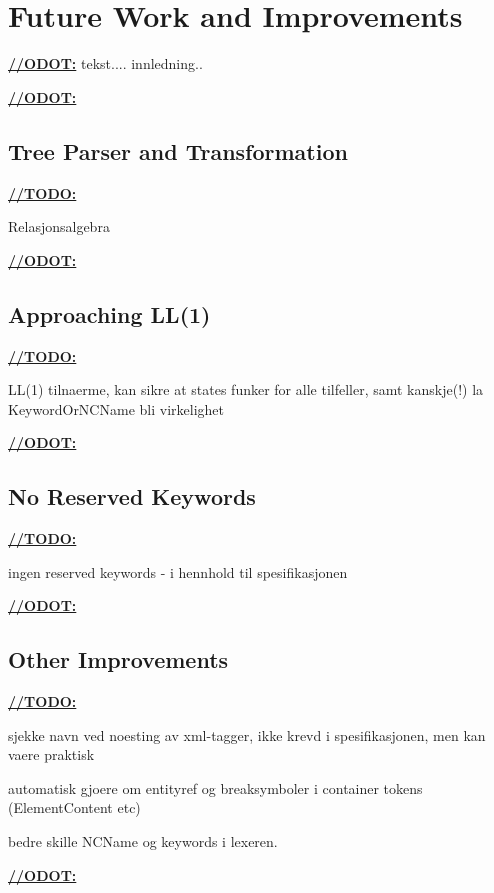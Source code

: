 \chapter{Future Work and Improvements}
\label{sect:summary:future_work}
\underline{\textbf{\LARGE //ODOT:}} tekst.... innledning..




\underline{\textbf{\LARGE //ODOT:}}

\section{Tree Parser and Transformation}
\underline{\textbf{\LARGE //TODO:}}

Relasjonsalgebra

\underline{\textbf{\LARGE //ODOT:}}

\section{Approaching LL(1)}

\underline{\textbf{\LARGE //TODO:}}

LL(1) tilnaerme, kan sikre at states funker for alle tilfeller, samt kanskje(!) la KeywordOrNCName bli virkelighet

\underline{\textbf{\LARGE //ODOT:}}

\section{No Reserved Keywords}

\underline{\textbf{\LARGE //TODO:}}

ingen reserved keywords - i hennhold til spesifikasjonen

\underline{\textbf{\LARGE //ODOT:}}

\section{Other Improvements}

\underline{\textbf{\LARGE //TODO:}}

sjekke navn ved noesting av xml-tagger, ikke krevd i spesifikasjonen, men kan vaere praktisk

automatisk gjoere om entityref og breaksymboler i container tokens (ElementContent etc)

bedre skille NCName og keywords i lexeren.

\underline{\textbf{\LARGE //ODOT:}}

